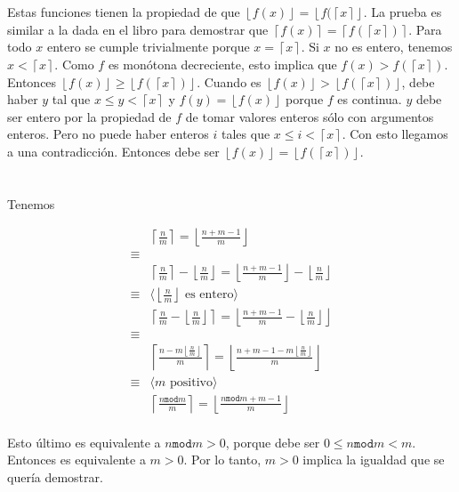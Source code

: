 \documentclass{article}
\newcommand{\piso}[1]{\left \lfloor #1 \right \rfloor}
\newcommand{\techo}[1]{\left \lceil #1 \right \rceil}
\begin{document}
\section{}

Estas funciones tienen la propiedad de que $\piso{f(x)} = \piso{f(\techo{x}}$.
La prueba es similar a la dada en el libro para demostrar que
$\techo{f(x)} = \techo{f(\techo{x})}$.
Para todo $x$ entero se cumple trivialmente porque $x = \techo{x}$. Si $x$ no
es entero, tenemos $x < \techo{x}$. Como $f$ es monótona decreciente, esto
implica que $f(x) > f(\techo{x})$. Entonces
$\piso{f(x)} \geq \piso{f(\techo{x})}$.
Cuando es $\piso{f(x)} > \piso{f(\techo{x})}$, debe haber $y$ tal que
$x \leq y < \techo{x}$ y $f(y) = \piso{f(x)}$ porque $f$ es continua.
$y$ debe
ser entero por la propiedad
de $f$ de tomar valores enteros sólo con argumentos enteros.
Pero no puede haber enteros $i$ tales que $x \leq i < \techo{x}$. 
Con esto llegamos
a una contradicción.
Entonces debe ser $\piso{f(x)} = \piso{f(\techo{x})}$.

\section{}

Tenemos

\begin{align*}
 & \techo{\frac{n}{m}} = \piso{\frac{n+m-1}{m}} \\
 \equiv & \\
 & \techo{\frac{n}{m}} - \piso{\frac{n}{m}} = \piso{\frac{n+m-1}{m}} - \piso{\frac{n}{m}} \\
 \equiv & \langle \piso{\frac{n}{m}} \text{ es entero} \rangle \\
 & \techo{\frac{n}{m} - \piso{\frac{n}{m}}} = \piso{\frac{n+m-1}{m} - \piso{\frac{n}{m}}} \\
 \equiv & \\
 & \techo{\frac{n - m\piso{\frac{n}{m}}}{m}} = \piso{\frac{n+m-1 - m\piso{\frac{n}{m}}}{m}} \\
 \equiv & \langle m \text{ positivo} \rangle \\
 & \techo{\frac{n \mathtt{mod} m}{m}} = \piso{\frac{n \mathtt{mod} m +m-1}{m}} \\
\end{align*}

Esto último es equivalente a $n \mathtt{mod} m > 0$, porque debe ser
$0 \leq n \mathtt{mod} m < m$.
Entonces es equivalente a $m > 0$. Por lo tanto, $m > 0$ implica la igualdad que se quería
demostrar.
\end{document}
